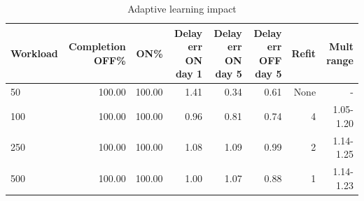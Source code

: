 \begin{table}[htbp]
\centering
\caption{Adaptive learning impact}
\label{tab:admfe-learning}
\begin{tabular}{lrrrrrrr}
\toprule
Workload & Completion OFF\% & ON\% & Delay err ON day 1 & Delay err ON day 5 & Delay err OFF day 5 & Refit & Mult range \\
\midrule
50 & 100.00 & 100.00 & 1.41 & 0.34 & 0.61 & None & - \\
100 & 100.00 & 100.00 & 0.96 & 0.81 & 0.74 & 4 & 1.05-1.20 \\
250 & 100.00 & 100.00 & 1.08 & 1.09 & 0.99 & 2 & 1.14-1.25 \\
500 & 100.00 & 100.00 & 1.00 & 1.07 & 0.88 & 1 & 1.14-1.23 \\
\bottomrule
\end{tabular}
\end{table}